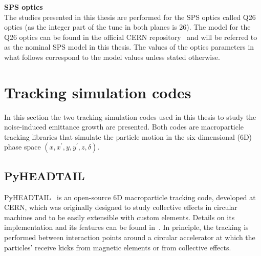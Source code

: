 \textbf{SPS optics}\\
The studies presented in this thesis are performed for the SPS optics called Q26 optics (as the integer part of the tune in both planes is 26). The model for the Q26 optics can be found in the official CERN repository~\cite{SPS_optics_repo} and will be referred to as the nominal SPS model in this thesis. The values of the optics parameters in what follows correspond to the model values unless stated otherwise.
\normalsize{\textbf{} %


\section{Tracking simulation codes}\label{sec:simualtion_codes}
In this section the two tracking simulation codes used in this thesis to study the noise-induced emittance growth are presented. Both codes are macroparticle tracking libraries that simulate the particle motion in the six-dimensional (6D) phase space $(x, x^\prime, y, y^\prime, z, \delta)$. 




\subsection{PyHEADTAIL}\label{subsec:pyheadtail}

PyHEADTAIL~\cite{pyheadtail_repository} is an open-source 6D macroparticle tracking code, developed at CERN, which was originally designed to study collective effects in circular machines and to be easily extensible with custom elements. 
Details on its implementation and its features can be found in~\cite{pyheadtail_manual_adrian, pyheadtail_schenk}. In principle, the tracking is performed between interaction points around a circular accelerator at which the particles' receive kicks from magnetic elements or from collective effects. 


}
